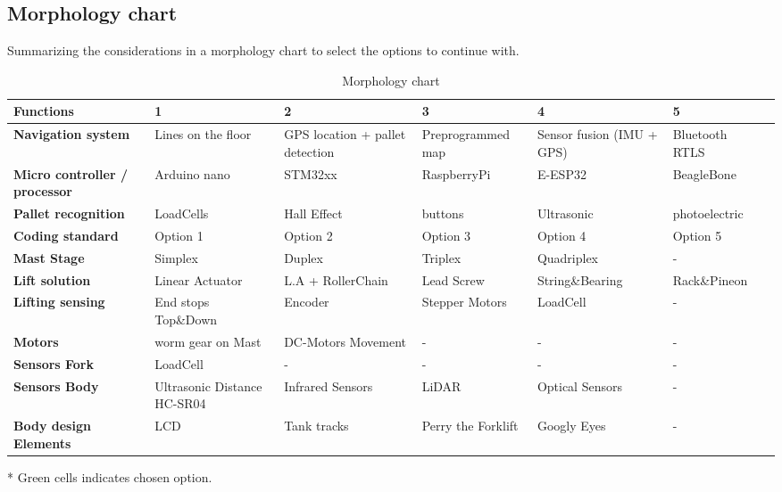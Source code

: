 \documentclass[../report.tex]{subfiles}
\begin{document}
\subsection{Morphology chart}
Summarizing the considerations in a morphology chart to select the options
to continue with.
\begin{table}[H]
    \begin{center}
        \begin{tabularx}{\linewidth}{|L|L|L|L|L|L|L}
            \hline
            \textbf{Functions} & \textbf{1} & \textbf{2}& \textbf{3} & 
            \textbf{4} & \textbf{5} \\
            \hline
            \textbf{Navigation system} & Lines on the floor & GPS location + pallet detection & Preprogrammed map  & Sensor fusion (IMU + GPS) & 
            Bluetooth RTLS \\
            \hline
            \textbf{Micro controller / processor} & Arduino nano & STM32xx & RaspberryPi& E-ESP32 & 
            BeagleBone \\
            \hline
            \textbf{Pallet recognition} & LoadCells & Hall Effect & buttons & Ultrasonic & 
            photoelectric \\
            \hline
            \textbf{Coding standard} & Option 1 & Option 2 & Option 3 & Option 4 & 
            Option 5 \\
            \hline
            \textbf{Mast Stage} & Simplex & Duplex & Triplex & Quadriplex & 
            -\\
            \hline
            \textbf{Lift solution} & Linear Actuator & L.A + RollerChain & Lead Screw& String\&Bearing & Rack\&Pineon \\
            \hline
            \textbf{Lifting sensing} & End stops Top\&Down & Encoder & Stepper Motors & LoadCell & 
            -\\
            \hline
            \textbf{Motors} & worm gear on Mast & DC-Motors Movement & - & - & 
            -\\
            \hline
            \textbf{Sensors Fork} & LoadCell & - & - & - & 
            -\\
            \hline
            \textbf{Sensors Body} & Ultrasonic Distance HC-SR04 & Infrared Sensors & LiDAR & Optical Sensors & 
            -\\
            \hline
            \textbf{Body design Elements} & LCD & Tank tracks &Perry the Forklift & Googly Eyes & 
            - \\
            \hline
        \end{tabularx}
    \end{center}
    \caption{Morphology chart}
\end{table}
* Green cells indicates chosen option.
\end{document}
